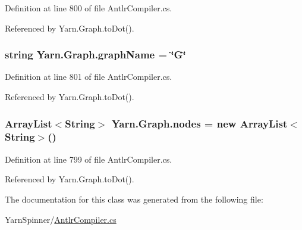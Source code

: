 Definition at line 800 of file Antlr\-Compiler.\-cs.



Referenced by Yarn.\-Graph.\-to\-Dot().

\hypertarget{a00110_a8605f1ec5a4e9cfd07d3ac2be042dac6}{
\subsubsection[{graph\-Name}]{\setlength{\rightskip}{0pt plus 5cm}string Yarn.\-Graph.\-graph\-Name = \char`\"{}G\char`\"{}}}\label{a00110_a8605f1ec5a4e9cfd07d3ac2be042dac6}


Definition at line 801 of file Antlr\-Compiler.\-cs.



Referenced by Yarn.\-Graph.\-to\-Dot().

\hypertarget{a00110_a506df6f737a41748c01239bdea5d82b1}{
\subsubsection[{nodes}]{\setlength{\rightskip}{0pt plus 5cm}Array\-List$<${\bf String}$>$ Yarn.\-Graph.\-nodes = new Array\-List$<${\bf String}$>$()}}\label{a00110_a506df6f737a41748c01239bdea5d82b1}


Definition at line 799 of file Antlr\-Compiler.\-cs.



Referenced by Yarn.\-Graph.\-to\-Dot().



The documentation for this class was generated from the following file\-:\begin{DoxyCompactItemize}
\item 
Yarn\-Spinner/\hyperlink{a00306}{Antlr\-Compiler.\-cs}\end{DoxyCompactItemize}
